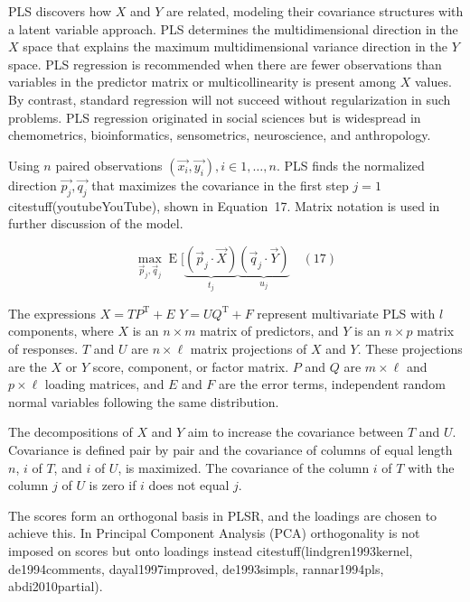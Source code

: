 \documentclass[preprint,12pt]{elsarticle}
\begin{document}
PLS discovers how $X$ and $Y$ are related, modeling their covariance structures with a latent variable approach. PLS determines the multidimensional direction in the $X$ space that explains the maximum multidimensional variance direction in the $Y$ space. PLS regression is recommended when there are fewer observations than variables in the predictor matrix or multicollinearity is present among $X$ values. By contrast, standard regression will not succeed without regularization in such problems. PLS regression originated in social sciences but is widespread in chemometrics, bioinformatics, sensometrics, neuroscience, and anthropology.

Using $n$ paired observations $\left(\vec{x_{i}}, \vec{y_{i}}\right), i \in 1, \dots, n$. PLS finds the normalized direction $\vec{p_{j}}, \vec{q_{j}}$ that maximizes the covariance in the first step $j = 1$ citestuff(youtubeYouTube), shown in Equation~17. Matrix notation is used in further discussion of the model.

\begin{equation}
	\max_{{\vec{p}}_{j},{\vec{q}}_{j}}\operatorname{E} [\underbrace{({\vec{p}}_{j}\cdot {\vec{X}})}_{t_{j}}\underbrace{({\vec{q}}_{j}\cdot {\vec{Y}})}_{u_{j}}
	\quad\left(17\right)
\end{equation}

The expressions $X=TP^{\mathrm{T}}+E$ $Y=UQ^{\mathrm{T}}+F$ represent  multivariate PLS with $l$ components, where $X$ is an $n\times m$ matrix of predictors, and $Y$ is an $n\times p$ matrix of responses. $T$ and $U$ are $n\times \ell$ matrix projections of $X$ and $Y$. These projections are the $X$ or $Y$ score, component, or factor matrix. $P$ and $Q$ are $m\times \ell $ and $p\times \ell $ loading matrices, and $E$ and $F$ are the error terms, independent random normal variables following the same distribution.

The decompositions of $X$ and $Y$ aim to increase the covariance between $T$ and $U$. Covariance is defined pair by pair and the covariance of columns of equal length $n$, $i$ of $T$, and $i$ of $U$, is maximized. The covariance of the column $i$ of $T$ with the column $j$ of $U$ is zero if $i$ does not equal $j$.

The scores form an orthogonal basis in PLSR, and the loadings are chosen to achieve this. In Principal Component Analysis (PCA) orthogonality is not imposed on scores but onto loadings instead citestuff(lindgren1993kernel, de1994comments, dayal1997improved, de1993simpls, rannar1994pls, abdi2010partial).
\end{document}
